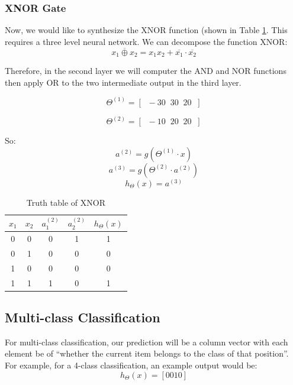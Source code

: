         \subsubsection{XNOR Gate}
        
        Now, we would like to synthesize the XNOR function (shown in Table \ref{tab:XNOR-gate}. This requires a three level neural network. We can decompose the function XNOR:
            \[
                \overline{ x_1 \oplus x_2} = x_1 x_2 + \overline{x_1}\cdot \overline{x_2}
            \] 
            
            Therefore, in the second layer we will computer the AND and NOR functions then apply OR to the two intermediate output in the third layer. 


            \[
                \Theta^{(1)} = [\;\; -30 \;\; 30 \;\; 20 \;\;]
            \]

            \[
                \Theta^{(2)} = [\;\; -10 \;\; 20 \;\; 20 \;\;]
            \]
            
            
            So:
            \[
                a^{(2)}= g(\Theta^{(1)} \cdot x)
            \]
            \[
                a^{(3)}= g(\Theta^{(2)} \cdot a^{(2)})
            \]
            \[
                h_\Theta (x)= a^{(3)} 
            \] 
   

            \begin{table}
                \begin{center}
                    \begin{tabular}[htbp]{|c|c||c|c||c|}
                        \hline
                    $x_1$   &   $x_2$   &   $a_1^{(2)}$ &   $a_2^{(2)}$ &   $h_\Theta (x)$\\
                    \hline \hline
                    0       &   0       &   0           &   1           &   1 \\
                    0       &   1       &   0           &   0           &   0 \\
                    1       &   0       &   0           &   0           &   0 \\
                    1       &   1       &   1           &   0           &   1 \\
                    \hline
                    \end{tabular}
                \end{center}
                \caption{Truth table of XNOR}
                \label{tab:XNOR-gate}
            \end{table}










            \subsection{Multi-class Classification}
                For multi-class classification, our prediction will be a column vector with each element be of ``whether the current item belongs to the class of that position''. For example, for a 4-class classification, an example output would be:
                \[
                    h_\Theta (x) = [0010]
                \] 
